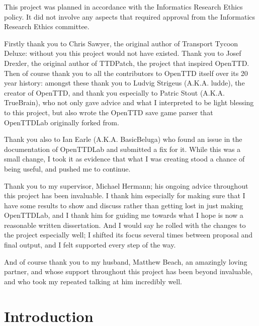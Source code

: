 \documentclass[logo,msc,dsti]{style/infthesis}    %
\begin{document}
\begin{preliminary}
\begin{ethics}
This project was planned in accordance with the Informatics Research
Ethics policy. It did not involve any aspects that required approval
from the Informatics Research Ethics committee.
\standarddeclaration
\end{ethics}

\begin{acknowledgements}

Firstly thank you to Chris Sawyer, the original author of Transport Tycoon Deluxe: without you this project would not have existed. Thank you to Josef Drexler, the original author of TTDPatch, the project that inspired OpenTTD. Then of course thank you to all the contributors to OpenTTD itself over its 20 year history: amongst these thank you to Ludvig Strigeus (A.K.A. ludde), the creator of OpenTTD, and thank you especially to Patric Stout (A.K.A. TrueBrain), who not only gave advice and what I interpreted to be light blessing to this project, but also wrote the OpenTTD save game parser that OpenTTDLab originally forked from.

Thank you also to Ian Earle (A.K.A. BasicBeluga) who found an issue in the documentation of OpenTTDLab and submitted a fix for it. While this was a small change, I took it as evidence that what I was creating stood a chance of being useful, and pushed me to continue.

Thank you to my supervisor, Michael Hermann; his ongoing advice throughout this project has been invaluable. I thank him especially for making sure that I have some results to show and discuss rather than getting lost in just making OpenTTDLab, and I thank him for guiding me towards what I hope is now a reasonable written dissertation. And I would say he rolled with the changes to the project especially well; I shifted its focus several times between proposal and final output, and I felt supported every step of the way.

And of course thank you to my husband, Matthew Beach, an amazingly loving partner, and whose support throughout this project has been beyond invaluable, and who took my repeated talking at him incredibly well.

\end{acknowledgements}

\tableofcontents

\end{preliminary}


\chapter{Introduction}
\label{chapter:introduction}
\end{document}

